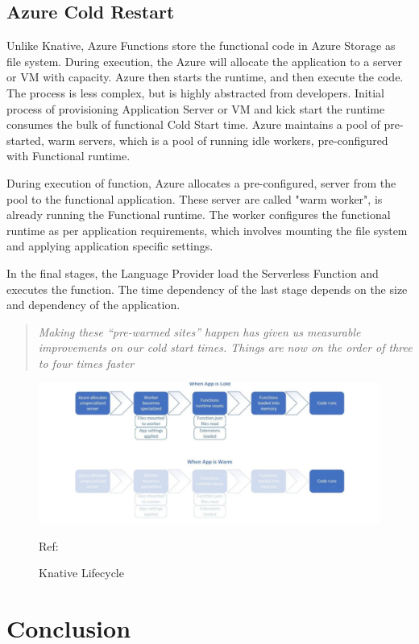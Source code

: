 \documentclass[12pt]{article}
\begin{document}
\begin{flushleft}
\subsection{Azure Cold Restart}
 Unlike Knative, Azure Functions store the functional code in Azure Storage as file system. During execution, the Azure will allocate the application to a server or VM with capacity. Azure then starts the runtime, and then execute the code. 
 The process is less complex, but is highly abstracted from developers. Initial process of provisioning Application Server or VM and kick start the runtime consumes the bulk of functional Cold Start time. 
 Azure maintains a pool of pre-started, warm servers, which is a pool of running idle workers, pre-configured with Functional runtime.

During execution of function, Azure allocates a pre-configured, server from the pool to the functional application. These server are called "warm worker", is already running the Functional runtime. 
The worker configures the functional runtime as per application requirements, which involves mounting the file system and applying application specific settings. 

In the final stages, the Language Provider load the Serverless Function and executes the function. The time dependency of the last stage depends on the size and dependency of the application.

\begin{quote}
    \textit{Making these “pre-warmed sites” happen has given us measurable improvements on our cold start times. Things are now on the order of three to four times faster
    }\\
    \cite{Understanding_serverless_cold_start_2018}
\end{quote}

\begin{figure}[h]
    \centering
    \includegraphics[width=1.0\linewidth]{images/Azure_lifecycle.PNG}
    \caption{Knative Lifecycle}
    Ref: \cite{Understanding_serverless_cold_start_2018}
    
\end{figure}

\end{flushleft}
\pagebreak


\section{Conclusion}



\printbibliography
\end{document}
